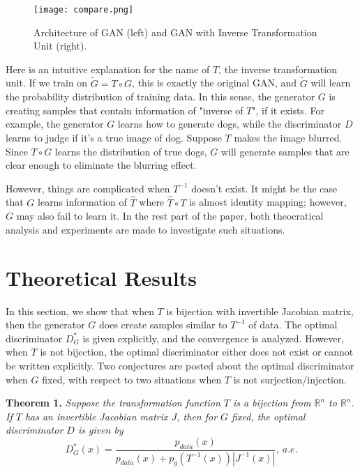 \documentclass{article}
\begin{document}
\begin{figure}[!h]
  \centering
  \texttt{[image: compare.png]}\\
  \caption{Architecture of GAN (left) and GAN with Inverse Transformation Unit (right).}\label{compare}
\end{figure}


Here is an intuitive explanation for the name of $T$, the inverse transformation unit. If we train on $\widetilde{G}=T\circ G$, this is exactly the original GAN, and $\widetilde{G}$ will learn the probability distribution of training data. In this sense, the generator $G$ is creating samples that contain information of "inverse of $T$", if it exists. For example, the generator $G$ learns how to generate dogs, while the discriminator $D$ learns to judge if it's a true image of dog. Suppose $T$ makes the image blurred. Since $T\circ G$ learns the distribution of true dogs, $G$ will generate samples that are clear enough to eliminate the blurring effect.

However, things are complicated when $T^{-1}$ doesn't exist. It might be the case that $G$ learns information of $\hat{T}$ where $\hat{T}\circ T$ is almost identity mapping; however, $G$ may also fail to learn it. In the rest part of the paper, both theocratical analysis and experiments are made to investigate such situations.


\section{Theoretical Results}
 In this section, we show that when $T$ is bijection with invertible Jacobian matrix, then the generator $G$ does create samples similar to $T^{-1}$ of data. The optimal discriminator $D_G^*$ is given explicitly, and the convergence is analyzed. However, when $T$ is not bijection, the optimal discriminator either does not exist or cannot be written explicitly. Two conjectures are posted about the optimal discriminator when $G$ fixed, with respect to two situations when $T$ is not surjection/injection.

\textbf{Theorem 1.} \textit{Suppose the transformation function $T$ is a bijection from $\mathbb{R}^n$ to $\mathbb{R}^n$. If $T$ has an invertible Jacobian matrix $J$, then for $G$ fixed, the optimal discriminator $D$ is given by}
\begin{equation}D_G^*(x)=\frac{p_{data}(x)}{p_{data}(x)+p_g(T^{-1}(x))|J^{-1}(x)|},\ a.e.\end{equation}
\end{document}
